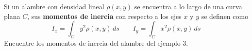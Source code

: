 \item Si un alambre con densidad lineal $\rho(x, y)$ se encuentra a lo largo de una curva plana $C$, sus \textbf{momentos de inercia} con respecto a los ejes $x$ y $y$ se definen como
    \[ I_x = \int_C y^2 \rho(x, y) \, ds \qquad I_y = \int_C x^2 \rho(x, y) \, ds \]
    Encuentre los momentos de inercia del alambre del ejemplo 3.
